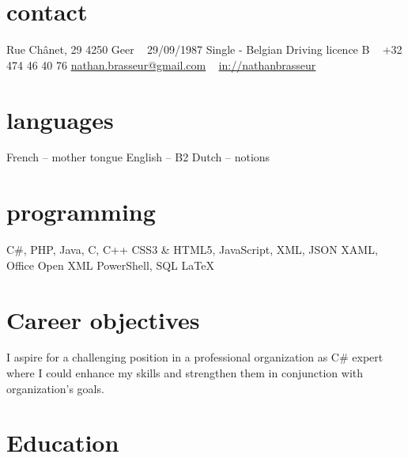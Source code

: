 \documentclass[a4paper]{cv-friggeri-x}
\begin{document}


\begin{aside} %
\section{contact}
\hfill Rue Chânet, 29
4250 Geer
~
29/09/1987
Single - Belgian
Driving licence B
~
\hfill +32 474 46 40 76
\hfill \href{mailto:nathan.brasseur@gmail.com}{nathan.brasseur@gmail.com}
~
\hfill \href{https://www.linkedin.com/in/nathanbrasseur/}{in://nathanbrasseur}\llogo 
~
\section{languages}
French -- mother tongue
English -- B2
Dutch -- notions
~
\section{programming}
C\#, PHP, Java, C, C++
CSS3 \& HTML5,
JavaScript, XML, JSON
XAML, Office Open XML
PowerShell, SQL
LaTeX
\end{aside}


\section{Career objectives}
I aspire for a challenging position in a professional organization as C\# expert where I could enhance my skills and strengthen them in conjunction with organization’s goals.


\section{Education}
\end{document}
